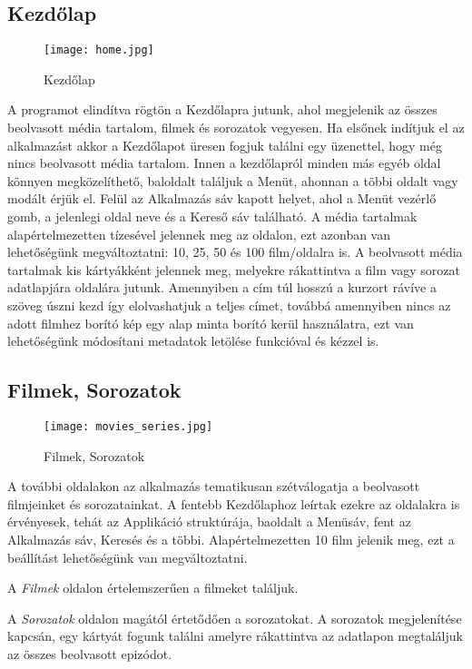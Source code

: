 \subsection{Kezdőlap}
\begin{figure}[H]
	\centering
	\texttt{[image: home.jpg]}
	\caption{Kezdőlap}
	\label{fig:home}
\end{figure}
A programot elindítva rögtön a Kezdőlapra jutunk, ahol megjelenik az összes beolvasott média tartalom, filmek és sorozatok vegyesen. Ha elsőnek indítjuk el az alkalmazást akkor a Kezdőlapot üresen fogjuk találni egy üzenettel, hogy még nincs beolvasott média tartalom. Innen a kezdőlapról minden más egyéb oldal könnyen megközelíthető, baloldalt találjuk a Menüt, ahonnan a többi oldalt vagy modált érjük el. Felül az Alkalmazás sáv kapott helyet, ahol a Menüt vezérlő gomb, a jelenlegi oldal neve és a Kereső sáv található. A média tartalmak alapértelmezetten tízesével jelennek meg az oldalon, ezt azonban van lehetőségünk megváltoztatni: 10, 25, 50 és 100 film/oldalra is. A beolvasott média tartalmak kis kártyákként jelennek meg, melyekre rákattintva a film vagy sorozat adatlapjára oldalára jutunk. Amennyiben a cím túl hosszú a kurzort rávíve a szöveg úszni kezd így elolvashatjuk a teljes címet, továbbá amennyiben nincs az adott filmhez borító kép egy alap minta borító kerül használatra, ezt van lehetőségünk módosítani metadatok letölése funkcióval és kézzel is.

\subsection{Filmek, Sorozatok}
\begin{figure}[H]
	\centering
	\texttt{[image: movies\_series.jpg]}
	\caption{Filmek, Sorozatok}
	\label{fig:movies_series}
\end{figure}
A további oldalakon az alkalmazás tematikusan szétválogatja a beolvasott filmjeinket és sorozatainkat. A fentebb Kezdőlaphoz leírtak ezekre az oldalakra is érvényesek, tehát az Applikáció struktúrája, baoldalt a Menüsáv, fent az Alkalmazás sáv, Keresés és a többi. Alapértelmezetten 10 film jelenik meg, ezt a beállítást lehetőségünk van megváltoztatni.

A {\it Filmek} oldalon értelemszerűen a filmeket találjuk.

A {\it Sorozatok} oldalon magától értetődően a sorozatokat. A sorozatok megjelenítése kapcsán, egy kártyát fogunk találni amelyre rákattintva az adatlapon megtaláljuk az összes beolvasott epizódot.

